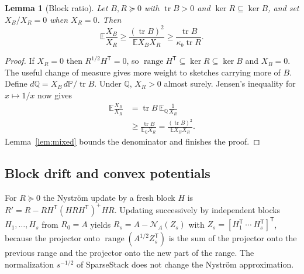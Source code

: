 \documentclass[11pt,a4paper]{article}
\newtheorem{lemma}[theorem]{Lemma}
\theoremstyle{definition}
\theoremstyle{remark}
\newcommand{\E}{\mathbb E}
\newcommand{\Prob}{\mathbb P}
\newcommand{\tr}{\operatorname{tr}}
\newcommand{\range}{\operatorname{range}}
\newcommand{\Nys}{\mathcal N}
\newcommand{\1}{\mathbf 1}
\newcommand{\T}{\mathsf T}
\begin{document}
\begin{lemma}[Block ratio]\label{lem:ratio}
Let $B,R\succeq0$ with $\tr B>0$ and $\ker R\subseteq\ker B$, and set
$X_B/X_R=0$ when $X_R=0$. Then
\[
 \E\frac{X_B}{X_R}\ge\frac{(\tr B)^2}{\E X_BX_R}\ge\frac{\tr B}{\kappa_b\tr R}.
\]
\end{lemma}
\begin{proof}
If $X_R=0$ then $R^{1/2}H^\T=0$, so $\range H^\T\subseteq\ker R\subseteq\ker B$
and $X_B=0$. The useful change of measure gives more weight to sketches carrying
more of $B$. Define $d\mathbb Q=X_B\,d\Prob/\tr B$.
Under $\mathbb Q$, $X_R>0$ almost surely. Jensen's inequality for
$x\mapsto1/x$ now gives
\begin{align*}
 \E\frac{X_B}{X_R}
 &=\tr B\,\E_{\mathbb Q}\frac1{X_R}\\
 &\ge\frac{\tr B}{\E_{\mathbb Q}X_R}
 =\frac{(\tr B)^2}{\E X_BX_R}.
\end{align*}
Lemma~\ref{lem:mixed} bounds the denominator and finishes the proof.
\end{proof}

\subsection{Block drift and convex potentials}
For $R\succeq0$ the Nystr\"om update by a fresh block $H$ is
$R'=R-RH^\T(HRH^\T)^+HR$. Updating successively by independent blocks
$H_1,\ldots,H_s$ from $R_0=A$ yields $R_s=A-\Nys_A(Z_s)$ with
$Z_s=[H_1^\T\ \cdots\ H_s^\T]^\T$, because the projector onto
$\range(A^{1/2}Z_s^\T)$ is the sum of the projector onto the previous
range and the projector onto the new part of the range. The normalization
$s^{-1/2}$ of SparseStack does not change the Nystr\"om approximation.
\end{document}
